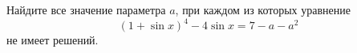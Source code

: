 \begin{ex}
	\begin{condition}
		Найдите все значение параметра \( a \), при каждом из которых уравнение \[ (1+\sin x)^4-4\sin x=7-a-a^2 \] не имеет решений.
	\end{condition}
\end{ex}